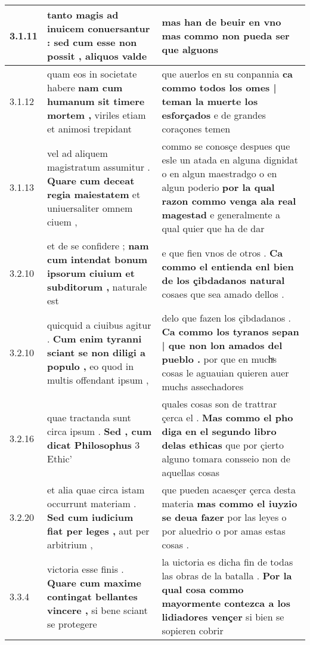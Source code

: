 \begin{tabular}{|p{1cm}|p{6.5cm}|p{6.5cm}|}
3.1.11 & tanto magis ad inuicem conuersantur : \textbf{ sed cum esse non possit , } aliquos valde & mas han de beuir en vno \textbf{ mas commo non pueda ser } que alguons \\\hline
3.1.12 & quam eos in societate habere \textbf{ nam cum humanum sit timere mortem , } viriles etiam et animosi trepidant & que auerlos en su conpannia \textbf{ ca commo todos los omes | teman la muerte los esforçados } e de grandes coraçones temen \\\hline
3.1.13 & vel ad aliquem magistratum assumitur . \textbf{ Quare cum deceat regia maiestatem } et uniuersaliter omnem ciuem , & commo se conosçe despues que esle un atada en alguna dignidat o en algun maestradgo o en algun poderio \textbf{ por la qual razon commo venga ala real magestad } e generalmente a qual quier que ha de dar \\\hline
3.2.10 & et de se confidere ; \textbf{ nam cum intendat bonum ipsorum ciuium et subditorum , } naturale est & e que fien vnos de otros . \textbf{ Ca commo el entienda enl bien de los çibdadanos natural } cosaes que sea amado dellos . \\\hline
3.2.10 & quicquid a ciuibus agitur . \textbf{ Cum enim tyranni sciant se non diligi a populo , } eo quod in multis offendant ipsum , & delo que fazen los çibdadanos . \textbf{ Ca commo los tyranos sepan | que non lon amados del pueblo . } por que en muchͣs cosas le aguauian quieren auer muchs assechadores \\\hline
3.2.16 & quae tractanda sunt circa ipsum . \textbf{ Sed , cum dicat Philosophus } 3 Ethic’ & quales cosas son de trattrar çerca el . \textbf{ Mas commo el pho diga en el segundo libro delas ethicas } que por çierto alguno tomara consseio non de aquellas cosas \\\hline
3.2.20 & et alia quae circa istam occurrunt materiam . \textbf{ Sed cum iudicium fiat per leges , } aut per arbitrium , & que pueden acaesçer çerca desta materia \textbf{ mas commo el iuyzio se deua fazer } por las leyes o por aluedrio o por amas estas cosas . \\\hline
3.3.4 & victoria esse finis . \textbf{ Quare cum maxime contingat bellantes vincere , } si bene sciant se protegere & la uictoria es dicha fin de todas las obras de la batalla . \textbf{ Por la qual cosa commo mayormente contezca a los lidiadores vençer } si bien se sopieren cobrir \\\hline

\end{tabular}
